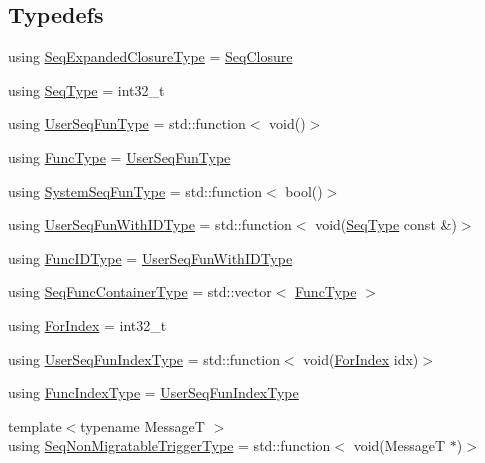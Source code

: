 \subsection*{Typedefs}
\begin{DoxyCompactItemize}
\item 
using \hyperlink{namespacevt_1_1seq_a322533ee3b8e3443e6808410aea39797}{Seq\+Expanded\+Closure\+Type} = \hyperlink{structvt_1_1seq_1_1_seq_closure}{Seq\+Closure}
\item 
using \hyperlink{namespacevt_1_1seq_a3b612da217ac669d39c159f134ab8434}{Seq\+Type} = int32\+\_\+t
\item 
using \hyperlink{namespacevt_1_1seq_aeb4674d25dcb5d27248b68ec83fad2b6}{User\+Seq\+Fun\+Type} = std\+::function$<$ void()$>$
\item 
using \hyperlink{namespacevt_1_1seq_a26c632e5cbf02395a8bbd9aa4c761232}{Func\+Type} = \hyperlink{namespacevt_1_1seq_aeb4674d25dcb5d27248b68ec83fad2b6}{User\+Seq\+Fun\+Type}
\item 
using \hyperlink{namespacevt_1_1seq_a80eeb50c74a4a3bd46fcf4d5213c5ebe}{System\+Seq\+Fun\+Type} = std\+::function$<$ bool()$>$
\item 
using \hyperlink{namespacevt_1_1seq_a1a58d0ebe1d6bbed8438607a9c717779}{User\+Seq\+Fun\+With\+I\+D\+Type} = std\+::function$<$ void(\hyperlink{namespacevt_1_1seq_a3b612da217ac669d39c159f134ab8434}{Seq\+Type} const  \&)$>$
\item 
using \hyperlink{namespacevt_1_1seq_a228aa2c36a3564f50232a32a8b4ff866}{Func\+I\+D\+Type} = \hyperlink{namespacevt_1_1seq_a1a58d0ebe1d6bbed8438607a9c717779}{User\+Seq\+Fun\+With\+I\+D\+Type}
\item 
using \hyperlink{namespacevt_1_1seq_a3d4575155fb9c0aeeb30b089adfdd04d}{Seq\+Func\+Container\+Type} = std\+::vector$<$ \hyperlink{namespacevt_1_1seq_a26c632e5cbf02395a8bbd9aa4c761232}{Func\+Type} $>$
\item 
using \hyperlink{namespacevt_1_1seq_a6c570c39bac8f93bafe0bf8a0db8c798}{For\+Index} = int32\+\_\+t
\item 
using \hyperlink{namespacevt_1_1seq_ab8466502cdb46b9f1d17e3e5630ed65a}{User\+Seq\+Fun\+Index\+Type} = std\+::function$<$ void(\hyperlink{namespacevt_1_1seq_a6c570c39bac8f93bafe0bf8a0db8c798}{For\+Index} idx)$>$
\item 
using \hyperlink{namespacevt_1_1seq_a822a80f3859b6840e7114128a06ac197}{Func\+Index\+Type} = \hyperlink{namespacevt_1_1seq_ab8466502cdb46b9f1d17e3e5630ed65a}{User\+Seq\+Fun\+Index\+Type}
\item 
{\footnotesize template$<$typename MessageT $>$ }\\using \hyperlink{namespacevt_1_1seq_aa88b0d93284d188be39704024ab58b8f}{Seq\+Non\+Migratable\+Trigger\+Type} = std\+::function$<$ void(MessageT $\ast$)$>$

\end{DoxyCompactItemize}
